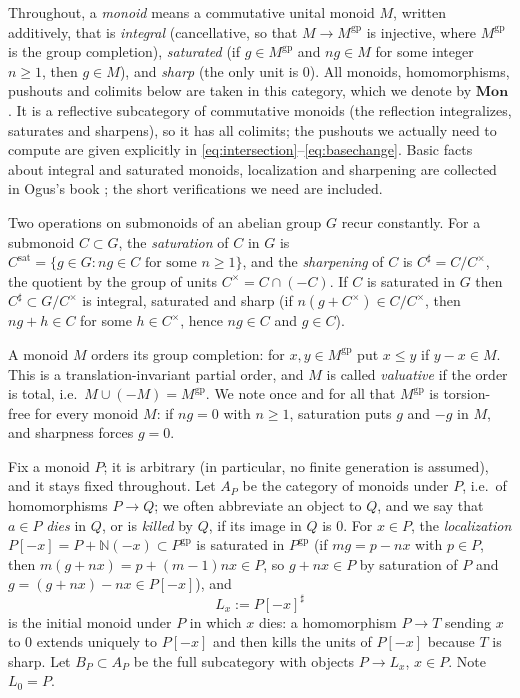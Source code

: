 \documentclass[11pt]{article}
\newcommand{\N}{\mathbb N}
\newcommand{\gp}{\mathrm{gp}}
\newcommand{\sat}{\mathrm{sat}}
\theoremstyle{definition}
\theoremstyle{remark}
\begin{document}
Throughout, a \emph{monoid} means a commutative unital monoid \(M\), written
additively, that is
\emph{integral} (cancellative, so that \(M\to M^{\gp}\) is injective, where
\(M^{\gp}\) is the group completion),
\emph{saturated} (if \(g\in M^{\gp}\) and \(ng\in M\) for some integer
\(n\ge1\), then \(g\in M\)), and
\emph{sharp} (the only unit is \(0\)).
All monoids, homomorphisms, pushouts and colimits below are taken in this
category, which we denote by \(\mathbf{Mon}\).  It is a reflective
subcategory of commutative monoids (the reflection integralizes, saturates
and sharpens), so it has all colimits; the pushouts we actually need to
compute are given explicitly in
\eqref{eq:intersection}--\eqref{eq:basechange}.  Basic facts about
integral and saturated monoids, localization and sharpening are collected in
Ogus's book \cite[Ch.~I, \S\S1.3--1.4]{ogus}; the short verifications we need
are included.

Two operations on submonoids of an abelian group \(G\) recur constantly.
For a submonoid \(C\subset G\), the \emph{saturation} of \(C\) in \(G\) is
\(C^{\sat}=\{g\in G:ng\in C\text{ for some }n\ge1\}\),
and the \emph{sharpening} of \(C\) is \(C^\sharp=C/C^\times\), the quotient by
the group of units \(C^\times=C\cap(-C)\).  If \(C\) is saturated in \(G\)
then \(C^\sharp\subset G/C^\times\) is integral, saturated and sharp
(if \(n(g+C^\times)\in C/C^\times\), then \(ng+h\in C\) for some
\(h\in C^\times\), hence \(ng\in C\) and \(g\in C\)).

A monoid \(M\) orders its group completion: for \(x,y\in M^{\gp}\) put
\(x\le y\) if \(y-x\in M\).  This is a translation-invariant partial order,
and \(M\) is called \emph{valuative} if the order is total, i.e.\
\(M\cup(-M)=M^{\gp}\).  We note once and for all that \(M^{\gp}\) is
torsion-free for every monoid \(M\): if \(ng=0\) with \(n\ge1\), saturation
puts \(g\) and \(-g\) in \(M\), and sharpness forces \(g=0\).

Fix a monoid \(P\); it is arbitrary (in particular, no finite generation
is assumed), and it stays fixed throughout.  Let \(A_P\) be the category of
monoids under \(P\),
i.e.\ of homomorphisms \(P\to Q\); we often abbreviate an object to \(Q\),
and we say that \(a\in P\) \emph{dies} in \(Q\), or is \emph{killed} by
\(Q\), if its image in \(Q\) is \(0\).
For \(x\in P\), the \emph{localization} \(P[-x]=P+\N(-x)\subset P^{\gp}\) is
saturated in \(P^{\gp}\) (if \(mg=p-nx\) with \(p\in P\), then
\(m(g+nx)=p+(m-1)nx\in P\), so \(g+nx\in P\) by saturation of \(P\) and
\(g=(g+nx)-nx\in P[-x]\)), and
\[
   L_x:=P[-x]^\sharp
\]
is the initial monoid under \(P\) in which \(x\) dies: a homomorphism
\(P\to T\) sending \(x\) to \(0\) extends uniquely to \(P[-x]\) and then
kills the units of \(P[-x]\) because \(T\) is sharp.  Let \(B_P\subset A_P\)
be the full subcategory with objects \(P\to L_x\), \(x\in P\).  Note
\(L_0=P\).
\end{document}
